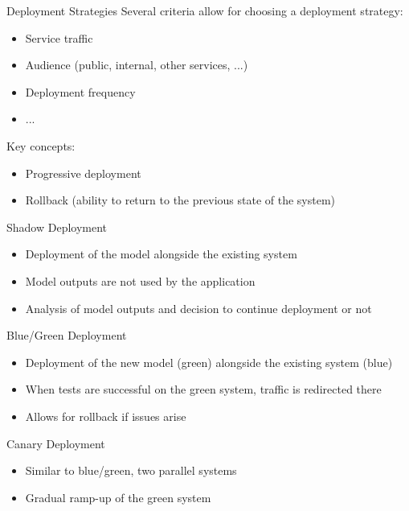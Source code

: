 \begin{frame}{Deployment Strategies}
  Several criteria allow for choosing a deployment strategy:

  \begin{itemize}
    \item Service traffic
    \item Audience (public, internal, other services, ...)
    \item Deployment frequency
    \item ...
  \end{itemize}

  Key concepts:
  \begin{itemize}
    \item Progressive deployment
    \item Rollback (ability to return to the previous state of the system)
  \end{itemize}
\end{frame}

\begin{frame}{Shadow Deployment}
  \begin{itemize}
    \item Deployment of the model alongside the existing system
    \item Model outputs are not used by the application
    \item Analysis of model outputs and decision to continue deployment or not
  \end{itemize}
\end{frame}

\begin{frame}{Blue/Green Deployment}
  \begin{itemize}
    \item Deployment of the new model (green) alongside the existing system (blue)
    \item When tests are successful on the green system, traffic is redirected there
    \item Allows for rollback if issues arise
  \end{itemize}
\end{frame}

\begin{frame}{Canary Deployment}
  \begin{itemize}
    \item Similar to blue/green, two parallel systems
    \item Gradual ramp-up of the green system
  \end{itemize}
\end{frame}

